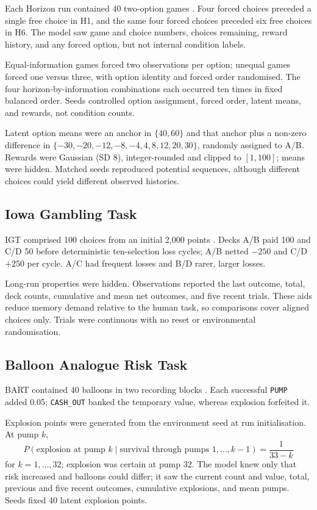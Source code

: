 \documentclass[logo,msc,inf]{infthesis}       %
\begin{document}
Each Horizon run contained 40 two-option games \cite{Wilson2014}. Four forced choices preceded a single free choice in H1, and the same four forced choices preceded six free choices in H6. The model saw game and choice numbers, choices remaining, reward history, and any forced option, but not internal condition labels.

Equal-information games forced two observations per option; unequal games forced one versus three, with option identity and forced order randomised. The four horizon-by-information combinations each occurred ten times in fixed balanced order. Seeds controlled option assignment, forced order, latent means, and rewards, not condition counts.

Latent option means were an anchor in $\{40,60\}$ and that anchor plus a non-zero difference in $\{-30,-20,-12,-8,-4,4,8,12,20,30\}$, randomly assigned to A/B. Rewards were Gaussian (SD 8), integer-rounded and clipped to $[1,100]$; means were hidden. Matched seeds reproduced potential sequences, although different choices could yield different observed histories.

\subsection{Iowa Gambling Task}

IGT comprised 100 choices from an initial 2,000 points \cite{Bechara1994}. Decks A/B paid 100 and C/D 50 before deterministic ten-selection loss cycles; A/B netted $-250$ and C/D $+250$ per cycle. A/C had frequent losses and B/D rarer, larger losses.

Long-run properties were hidden. Observations reported the last outcome, total, deck counts, cumulative and mean net outcomes, and five recent trials. These aids reduce memory demand relative to the human task, so comparisons cover aligned choices only. Trials were continuous with no reset or environmental randomisation.

\subsection{Balloon Analogue Risk Task}

BART contained 40 balloons in two recording blocks \cite{Lejuez2002}. Each successful \texttt{PUMP} added 0.05; \texttt{CASH\_OUT} banked the temporary value, whereas explosion forfeited it.

Explosion points were generated from the environment seed at run initialisation. At pump $k$,
\[
P(\text{explosion at pump }k\mid\text{survival through pumps }1,\ldots,k-1)=\frac{1}{33-k}
\]
for $k=1,\ldots,32$; explosion was certain at pump 32. The model knew only that risk increased and balloons could differ; it saw the current count and value, total, previous and five recent outcomes, cumulative explosions, and mean pumps. Seeds fixed 40 latent explosion points.
\end{document}

